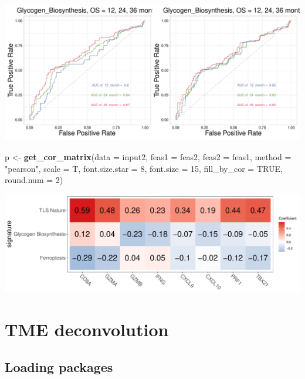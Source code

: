 \documentclass[
  12pt,
]{book}
\newenvironment{Shaded}{\begin{snugshade}}{\end{snugshade}}
\newcommand{\AttributeTok}[1]{\textcolor[rgb]{0.13,0.29,0.53}{#1}}
\newcommand{\ConstantTok}[1]{\textcolor[rgb]{0.56,0.35,0.01}{#1}}
\newcommand{\DecValTok}[1]{\textcolor[rgb]{0.00,0.00,0.81}{#1}}
\newcommand{\FunctionTok}[1]{\textcolor[rgb]{0.13,0.29,0.53}{\textbf{#1}}}
\newcommand{\NormalTok}[1]{#1}
\newcommand{\OtherTok}[1]{\textcolor[rgb]{0.56,0.35,0.01}{#1}}
\newcommand{\StringTok}[1]{\textcolor[rgb]{0.31,0.60,0.02}{#1}}
\theoremstyle{definition}
\theoremstyle{definition}
\theoremstyle{definition}
\theoremstyle{definition}
\theoremstyle{remark}
\begin{document}
\includegraphics{_main_files/figure-latex/unnamed-chunk-42-1.pdf}

\begin{Shaded}
\begin{Highlighting}[]
\NormalTok{p }\OtherTok{\textless{}{-}} \FunctionTok{get\_cor\_matrix}\NormalTok{(}\AttributeTok{data           =}\NormalTok{ input2, }
                    \AttributeTok{feas1          =}\NormalTok{ feas2, }
                    \AttributeTok{feas2          =}\NormalTok{ feas1,}
                    \AttributeTok{method         =} \StringTok{"pearson"}\NormalTok{,}
                    \AttributeTok{scale          =}\NormalTok{ T, }
                    \AttributeTok{font.size.star =} \DecValTok{8}\NormalTok{, }
                    \AttributeTok{font.size      =} \DecValTok{15}\NormalTok{, }
                    \AttributeTok{fill\_by\_cor    =} \ConstantTok{TRUE}\NormalTok{, }
                    \AttributeTok{round.num      =} \DecValTok{2}\NormalTok{)}
\end{Highlighting}
\end{Shaded}

\includegraphics{_main_files/figure-latex/unnamed-chunk-43-1.pdf}

\hypertarget{tme-deconvolution}{%
\chapter{TME deconvolution}\label{tme-deconvolution}}

\hypertarget{loading-packages-1}{%
\section{Loading packages}\label{loading-packages-1}}
\end{document}
